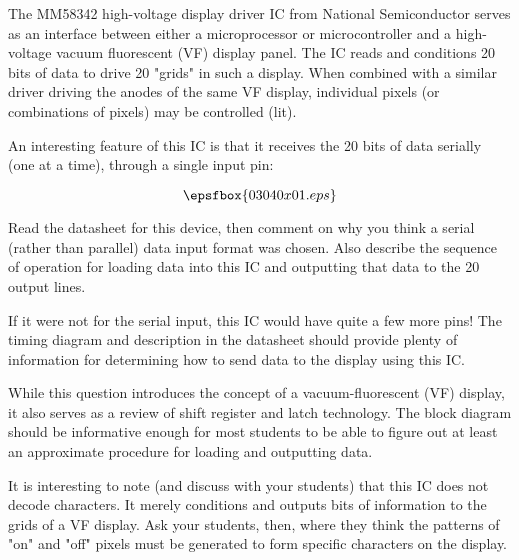 

The MM58342 high-voltage display driver IC from National Semiconductor serves as an interface between either a microprocessor or microcontroller and a high-voltage vacuum fluorescent (VF) display panel.  The IC reads and conditions 20 bits of data to drive 20 "grids" in such a display.  When combined with a similar driver driving the anodes of the same VF display, individual pixels (or combinations of pixels) may be controlled (lit).

An interesting feature of this IC is that it receives the 20 bits of data serially (one at a time), through a single input pin:

$$\epsfbox{03040x01.eps}$$

Read the datasheet for this device, then comment on why you think a serial (rather than parallel) data input format was chosen.  Also describe the sequence of operation for loading data into this IC and outputting that data to the 20 output lines.







If it were not for the serial input, this IC would have quite a few more pins!  The timing diagram and description in the datasheet should provide plenty of information for determining how to send data to the display using this IC.







While this question introduces the concept of a vacuum-fluorescent (VF) display, it also serves as a review of shift register and latch technology.  The block diagram should be informative enough for most students to be able to figure out at least an approximate procedure for loading and outputting data.

It is interesting to note (and discuss with your students) that this IC does not decode characters.  It merely conditions and outputs bits of information to the grids of a VF display.  Ask your students, then, where they think the patterns of "on" and "off" pixels must be generated to form specific characters on the display.




